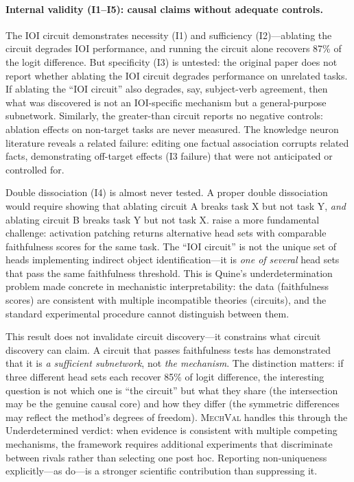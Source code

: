 \documentclass{article}
\newcommand{\mechval}{\textsc{MechVal}}
\begin{document}
\paragraph{Internal validity (I1--I5): causal claims without adequate controls.}
The IOI circuit demonstrates necessity (I1) and sufficiency (I2)---ablating the circuit degrades IOI performance, and running the circuit alone recovers 87\% of the logit difference. But specificity (I3) is untested: the original paper does not report whether ablating the IOI circuit degrades performance on unrelated tasks. If ablating the ``IOI circuit'' also degrades, say, subject-verb agreement, then what was discovered is not an IOI-specific mechanism but a general-purpose subnetwork. Similarly, the greater-than circuit \citep{hanna2023greater} reports no negative controls: ablation effects on non-target tasks are never measured. The knowledge neuron literature \citep{dai2022knowledge} reveals a related failure: editing one factual association corrupts related facts, demonstrating off-target effects (I3 failure) that were not anticipated or controlled for.

Double dissociation (I4) is almost never tested. A proper double dissociation would require showing that ablating circuit A breaks task X but not task Y, \emph{and} ablating circuit B breaks task Y but not task X. \citet{meloux2025everything} raise a more fundamental challenge: activation patching returns alternative head sets with comparable faithfulness scores for the same task. The ``IOI circuit'' is not the unique set of heads implementing indirect object identification---it is \emph{one of several} head sets that pass the same faithfulness threshold. This is Quine's underdetermination problem \citep{quine1951two} made concrete in mechanistic interpretability: the data (faithfulness scores) are consistent with multiple incompatible theories (circuits), and the standard experimental procedure cannot distinguish between them.

This result does not invalidate circuit discovery---it constrains what circuit discovery can claim. A circuit that passes faithfulness tests has demonstrated that it is \emph{a sufficient subnetwork}, not \emph{the mechanism}. The distinction matters: if three different head sets each recover 85\% of logit difference, the interesting question is not which one is ``the circuit'' but what they share (the intersection may be the genuine causal core) and how they differ (the symmetric differences may reflect the method's degrees of freedom). \mechval{} handles this through the Underdetermined verdict: when evidence is consistent with multiple competing mechanisms, the framework requires additional experiments that discriminate between rivals rather than selecting one post hoc. Reporting non-uniqueness explicitly---as \citet{meloux2025everything} do---is a stronger scientific contribution than suppressing it.
\end{document}
